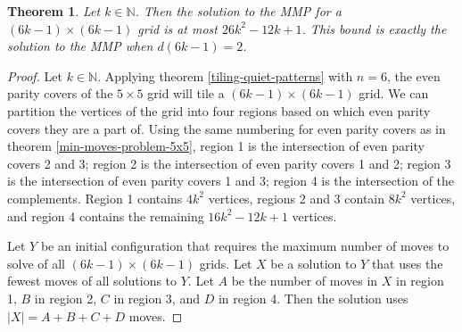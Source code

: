 \documentclass[a4paper]{article}
\newtheorem{theorem}{Theorem}
\newcommand{\N}{\mathbb{N}}
\newcommand{\abs}[1]{\left| #1 \right|}
\begin{document}
	\begin{theorem}\label{min-moves-problem-6k-1x6k-1}
		Let $k \in \N$.
		Then the solution to the MMP for a $(6k - 1) \times (6k - 1)$ grid is at most $26k^2 - 12k + 1$.
		This bound is exactly the solution to the MMP when $d(6k-1)=2$.
	\end{theorem}
	\begin{proof}
		Let $k \in \N$.
		Applying theorem \ref{tiling-quiet-patterns} with $n=6$, the even parity covers of the $5 \times 5$ grid will tile a $(6k - 1) \times (6k - 1)$ grid.
		We can partition the vertices of the grid into four regions based on which even parity covers they are a part of.
		Using the same numbering for even parity covers as in theorem \ref{min-moves-problem-5x5}, region 1 is the intersection of even parity covers 2 and 3; region 2 is the intersection of even parity covers 1 and 2; region 3 is the intersection of even parity covers 1 and 3; region 4 is the intersection of the complements.
		Region 1 contains $4k^2$ vertices, regions 2 and 3 contain $8k^2$ vertices, and region 4 contains the remaining $16k^2 - 12k + 1$ vertices.
		
		Let $Y$ be an initial configuration that requires the maximum number of moves to solve of all $(6k-1)\times(6k-1)$ grids.
		Let $X$ be a solution to $Y$ that uses the fewest moves of all solutions to $Y$.
		Let $A$ be the number of moves in $X$ in region 1, $B$ in region 2, $C$ in region 3, and $D$ in region 4.
		Then the solution uses $\abs{X} = A + B + C + D$ moves.
		

\end{proof}
\end{document}
